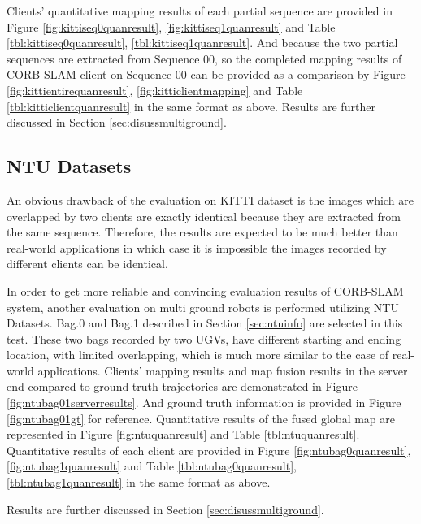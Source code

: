 Clients' quantitative mapping results of each partial sequence are provided in Figure \ref{fig:kittiseq0quanresult}, \ref{fig:kittiseq1quanresult}  and Table \ref{tbl:kittiseq0quanresult}, \ref{tbl:kittiseq1quanresult}. And because the two partial sequences are extracted from Sequence 00, so the completed mapping results of CORB-SLAM client on Sequence 00 can be provided as a comparison by Figure \ref{fig:kittientirequanresult}, \ref{fig:kitticlientmapping} and Table \ref{tbl:kitticlientquanresult} in the same format as above. Results are further discussed in Section \ref{sec:disussmultiground}.



\subsection{NTU Datasets}

An obvious drawback of the evaluation on KITTI dataset is the images which are overlapped by two clients are exactly identical because they are extracted from the same sequence. Therefore, the results are expected to be much better than real-world applications in which case it is impossible the images recorded by different clients can be identical.

In order to get more reliable and convincing evaluation results of  CORB-SLAM system, another evaluation on multi ground robots is performed utilizing NTU Datasets. Bag.0 and Bag.1 described in Section \ref{sec:ntuinfo} are selected in this test. These two bags recorded by two UGVs, have different starting and ending location, with limited overlapping, which is much more similar to the case of real-world applications. Clients' mapping results and map fusion results in the server end compared to ground truth trajectories are demonstrated in Figure \ref{fig:ntubag01serverresults}. And ground truth information is provided in Figure \ref{fig:ntubag01gt} for reference. Quantitative results of the fused global map are represented in Figure \ref{fig:ntuquanresult} and Table \ref{tbl:ntuquanresult}. Quantitative results of each client are provided in Figure \ref{fig:ntubag0quanresult}, \ref{fig:ntubag1quanresult} and Table \ref{tbl:ntubag0quanresult}, \ref{tbl:ntubag1quanresult} in the same format as above.

Results are further discussed in Section \ref{sec:disussmultiground}.




